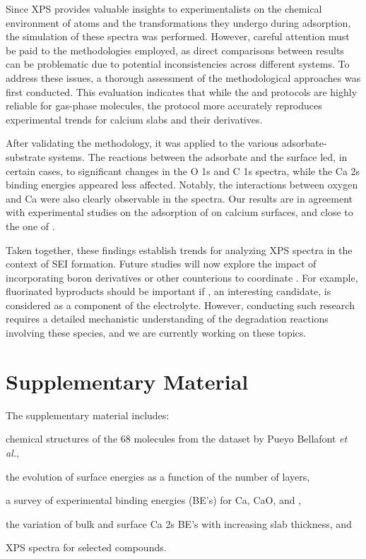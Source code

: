 \documentclass[%
aip,
amsmath,amssymb,
preprint,%
jcp,
showkeys,
]{revtex4-2}
\begin{document}
Since XPS provides valuable insights  to experimentalists on the chemical environment of atoms and the transformations they undergo during adsorption, the simulation of these spectra was performed. However, careful attention must be paid to the methodologies employed, as direct comparisons between results can be problematic due to potential inconsistencies across different systems. To address these issues, a thorough assessment of the methodological approaches was first conducted. This evaluation indicates that while the  and  protocols are highly reliable for gas-phase molecules, the  protocol more accurately reproduces experimental trends for calcium slabs and their derivatives.

After validating the methodology, it was applied to the various adsorbate-substrate systems. The reactions between the adsorbate and the surface led,  in certain cases, to significant changes in the O 1s and C 1s spectra, while the Ca 2s binding energies appeared less affected. Notably, the interactions between oxygen and Ca were also clearly observable in the spectra. Our results are in agreement with experimental studies on the adsorption of  on calcium surfaces, and close to the one of .\cite{voigtsAdsorptionCO2CO2009}

Taken together, these findings establish trends for analyzing XPS spectra in the context of SEI formation. Future studies will now explore the impact of incorporating boron derivatives or other counterions to coordinate . For example, fluorinated byproducts should be important if  , an interesting candidate,\cite{bodinBoronBasedFunctionalAdditives2023} is considered as a component of the electrolyte. However, conducting such research requires a detailed mechanistic understanding of the degradation reactions involving these species,\cite{youngPreventingElectrolyteDecomposition2021,yamijalaStabilityCalciumIon2021,baonguyenInvestigatingAbnormalConductivity2022,nguyenSolvationReductionCoupling2023} and we are currently working on these topics.

\clearpage
\section*{Supplementary Material}

The supplementary material includes: \begin{inparaenum}[(i)]
	\item chemical structures of the 68 molecules from the dataset by Pueyo Bellafont \textit{et al.}\cite{pueyobellafontPredictingCoreLevel2017},
	\item the evolution of surface energies as a function of the number of layers,
	\item a survey of experimental binding energies (BE's) for Ca, CaO, and ,
	\item the variation of bulk and surface Ca 2s BE's with increasing slab thickness, and
	\item XPS spectra for selected compounds.
\end{inparaenum}
\end{document}
